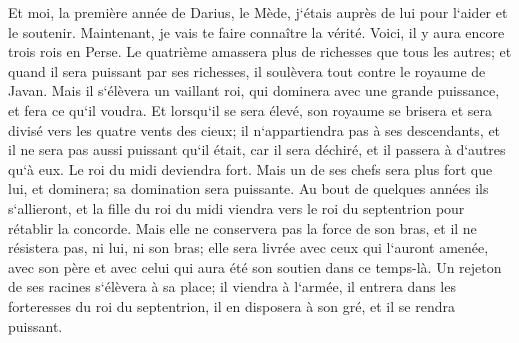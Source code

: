 \verse Et moi, la première année de Darius, le Mède, j`étais auprès de lui pour l`aider et le soutenir. 
\verse Maintenant, je vais te faire connaître la vérité. Voici, il y aura encore trois rois en Perse. Le quatrième amassera plus de richesses que tous les autres; et quand il sera puissant par ses richesses, il soulèvera tout contre le royaume de Javan. 
\verse Mais il s`élèvera un vaillant roi, qui dominera avec une grande puissance, et fera ce qu`il voudra. 
\verse Et lorsqu`il se sera élevé, son royaume se brisera et sera divisé vers les quatre vents des cieux; il n`appartiendra pas à ses descendants, et il ne sera pas aussi puissant qu`il était, car il sera déchiré, et il passera à d`autres qu`à eux. 
\verse Le roi du midi deviendra fort. Mais un de ses chefs sera plus fort que lui, et dominera; sa domination sera puissante. 
\verse Au bout de quelques années ils s`allieront, et la fille du roi du midi viendra vers le roi du septentrion pour rétablir la concorde. Mais elle ne conservera pas la force de son bras, et il ne résistera pas, ni lui, ni son bras; elle sera livrée avec ceux qui l`auront amenée, avec son père et avec celui qui aura été son soutien dans ce temps-là. 
\verse Un rejeton de ses racines s`élèvera à sa place; il viendra à l`armée, il entrera dans les forteresses du roi du septentrion, il en disposera à son gré, et il se rendra puissant. 
